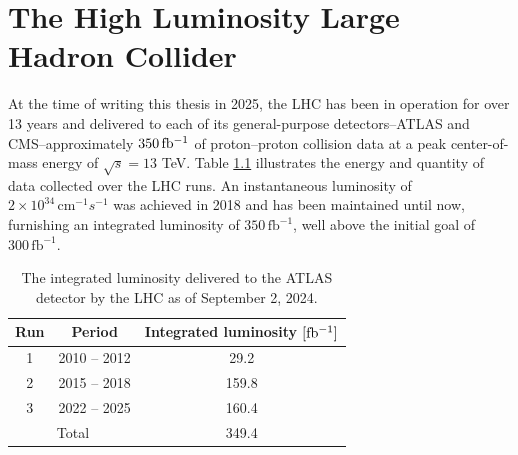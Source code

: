 \chapter{The High Luminosity Large Hadron Collider}


At the time of writing this thesis in 2025, the LHC has been in operation for over 13 years and delivered to each of its general-purpose detectors--ATLAS and CMS--approximately $350\,\mbox{fb\(^{-1}\)}$ of proton--proton collision data at a peak center-of-mass energy of $\sqrt{s}=13$ TeV. 
Table \ref{tab:lhc-int-lumi} illustrates  the energy and quantity of data collected over the LHC runs. 
An instantaneous luminosity of $2\times 10^{34} \, \mathrm{cm}^{-1}s^{-1}$ was achieved in 2018 and has been maintained until now, furnishing an integrated luminosity of $350\,\mathrm{fb}^{-1}$, well above the initial goal of $300\,\mathrm{fb}^{-1}$.

\begin{table}[h!]
    \centering
    \begin{tabular}{|c|c|c|}
    \hline
        Run & Period & Integrated luminosity $[\mbox{fb\(^{-1}\)}]$ \\ \hline
        1 & 2010 -- 2012 & 29.2 \\
        2 & 2015 -- 2018 & 159.8 \\
        3 & 2022 -- 2025 & 160.4 \\ \hline \hline
        \multicolumn{2}{|c|}{Total} & 349.4 \\
        \hline
    \end{tabular}
    \caption{The integrated luminosity delivered to the ATLAS detector by the LHC as of September 2, 2024. }
    \label{tab:lhc-int-lumi}
\end{table}

